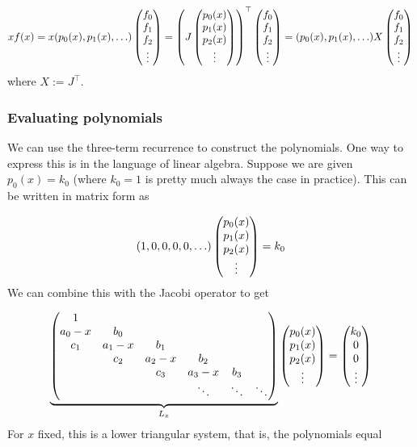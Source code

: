\documentclass[12pt,a4paper]{article}
\begin{document}
\[
x f(x) = x (p_0(x) ,  p_1(x) , \ldots ) \begin{pmatrix}f_0\\ f_1\\f_2\\\vdots\end{pmatrix} =
    \left(J \begin{pmatrix} p_0(x) \cr p_1(x) \cr p_2(x) \cr \vdots \end{pmatrix}\right)^\top  \begin{pmatrix}f_0\\ f_1\\f_2\\\vdots\end{pmatrix} = (p_0(x) ,  p_1(x) , \ldots ) X \begin{pmatrix}f_0\\ f_1\\f_2\\\vdots\end{pmatrix}
\]
where $X := J^\top$.

\subsubsection{Evaluating polynomials}
We can use the three-term recurrence to construct the polynomials. One way to express this is in the language of linear algebra. Suppose we are given $p_0(x) = k_0$ (where $k_0 = 1$ is pretty much always the case in practice). This can be written in matrix form as

\[
(1,0,0,0,0,\ldots) \begin{pmatrix} p_0(x) \cr p_1(x) \cr p_2(x) \cr \vdots \end{pmatrix} = k_0
\]
We can combine this with the Jacobi operator to get

\[
\underbrace{\begin{pmatrix}
1 \\
a_0-x & b_0 \\
c_1 & a_1-x & b_1 \\
& c_2 & a_2-x & b_2 \cr
&& c_3 & a_3-x & b_3 \cr
&&&\ddots & \ddots & \ddots
\end{pmatrix}}_{L_x} \begin{pmatrix} p_0(x) \cr p_1(x) \cr p_2(x) \cr \vdots \end{pmatrix} = \begin{pmatrix} k_0\cr 0 \cr 0 \cr \vdots \end{pmatrix}
\]
For $x$ fixed, this is a lower triangular system, that is, the polynomials equal
\end{document}
